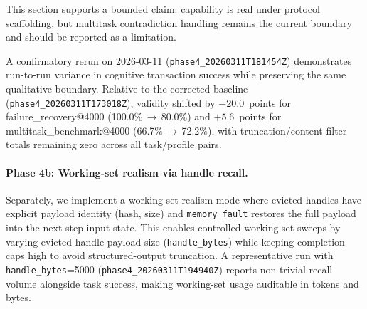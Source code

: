 This section supports a bounded claim: capability is real under protocol
scaffolding, but multitask contradiction handling remains the current
boundary and should be reported as a limitation.

A confirmatory rerun on 2026-03-11 (\texttt{phase4\_20260311T181454Z})
demonstrates run-to-run variance in cognitive transaction success while
preserving the same qualitative boundary. Relative to the corrected baseline
(\texttt{phase4\_20260311T173018Z}),
validity shifted by $-20.0$~points for failure\_recovery@4000
(100.0\%\,$\rightarrow$\,80.0\%) and $+5.6$~points for multitask\_benchmark@4000
(66.7\%\,$\rightarrow$\,72.2\%), with truncation/content-filter totals
remaining zero across all task/profile pairs.

\paragraph{Phase 4b: Working-set realism via handle recall.}
Separately, we implement a working-set realism mode where evicted handles
have explicit payload identity (hash, size) and \texttt{memory\_fault}
restores the full payload into the next-step input state. This enables
controlled working-set sweeps by varying evicted handle payload size
(\texttt{handle\_bytes}) while keeping completion caps high to avoid
structured-output truncation. A representative run with
\texttt{handle\_bytes}=5000 (\texttt{phase4\_20260311T194940Z}) reports
non-trivial recall volume alongside task success, making working-set usage
auditable in tokens and bytes.
